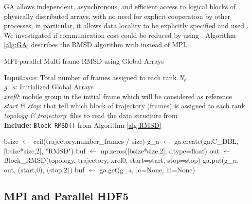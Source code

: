 GA allows independent, asynchronous, and efficient access to logical blocks of physically distributed arrays, with no need for explicit cooperation by other processes; in particular, it allows data locality to be explicitly specified and used \cite{GA-NUMA}.
We investigated if communication cost could be reduced by using .
Algorithm \ref{alg:GA} describes the RMSD algorithm with  instead of MPI.


\begin{algorithm}[ht!]
	\scriptsize
	\caption{MPI-parallel Multi-frame RMSD using Global Arrays}
	\label{alg:GA}
	\hspace*{\algorithmicindent} \textbf{Input:}\emph{size}: Total number of frames assigned to each rank $N_{b}$\\
	\hspace*{\algorithmicindent} \emph{g\_a}: Initialized Global Arrays \\
	\hspace*{\algorithmicindent} \emph{xref0}: mobile group in the initial frame which will be considered as reference \\
	\hspace*{\algorithmicindent} \emph{start \& stop}: that tell which block of trajectory (frames) is assigned to each rank \\
	\hspace*{\algorithmicindent} \emph{topology \& trajectory}: files to read the data structure from \\
	\hspace*{\algorithmicindent}\textbf{Include:} \texttt{Block\_RMSD()} from Algorithm \ref{alg:RMSD}
	\begin{algorithmic}[1]
		
		\State bsize $\leftarrow$ ceil(trajectory.number\_frames / size)
		\State g\_a $\leftarrow$ ga.create(ga.C\_DBL, [bsize*size,2], "RMSD")
		\State buf $\leftarrow$ np.zeros([bsize*size,2], dtype=float)
		\State out $\leftarrow$ Block\_RMSD(topology, trajectory, xref0, start=start, stop=stop)
		\State ga.put(g\_a, out, (start,0), (stop,2))
		\State buf $\leftarrow$ ga.get(g\_a, lo=None, hi=None)
		\EndIf
	\end{algorithmic}
\end{algorithm}

\subsection{MPI and Parallel HDF5}
\label{sec:methods-hdf5}

